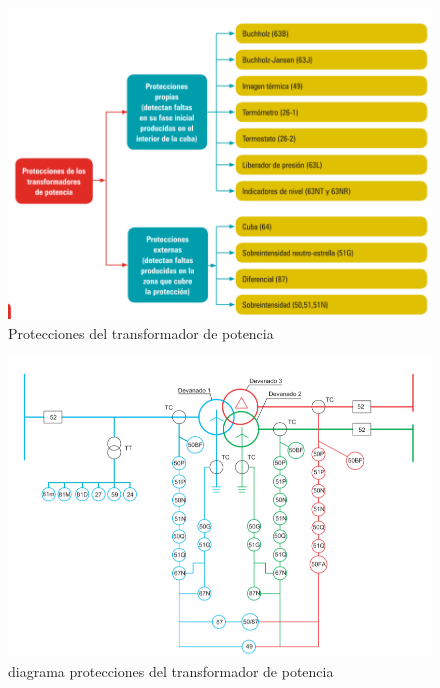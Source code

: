 \documentclass[a5paper]{book}%
\begin{document}
    \begin{figure}[H]
      \centering  
      \caption{Protecciones del transformador de potencia}
      \label{fig:proteccionestrafo}
      \includegraphics[width=\linewidth]{proteccion_trafo}
    \end{figure}

        \begin{figure}[H]
      \centering  
      \caption{diagrama protecciones del  transformador de potencia}
      \label{fig:diagramatrafo}
      \includegraphics[width=\linewidth]{diagramapttrafo}
    \end{figure}
\end{document}
